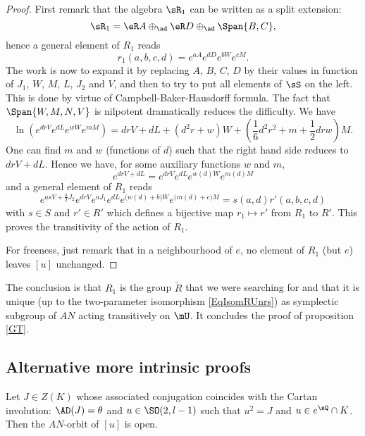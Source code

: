 \begin{proof}

First remark that the algebra $\sR_1$ can be written as a split extension:
\[ 
  \sR_1=\eR A\oplus_{\ad} \eR D\oplus_{\ad}\Span\{ B,C \},
\]
hence a general element of $R_1$ reads
 \begin{equation}
r_1(a,b,c,d)= e^{aA} e^{dD} e^{bW} e^{cM}.
\end{equation}
The work is now to expand it by replacing $A$, $B$, $C$, $D$ by their values in function of $J_1$, $W$, $M$, $L$, $J_2$ and $V$, and then to try to put all elements of $\sS$ on the left. This is done by virtue of Campbell-Baker-Hausdorff formula. The fact that $\Span\{ W,M,N,V \}$ is nilpotent dramatically reduces the difficulty. We have
\[ 
  \ln( e^{drV} e^{dL} e^{wW} e^{mM})= drV+dL+(d^{2}r+w)W+(\frac{1}{ 6 }d^{2}r^{2}+m+\frac{ 1 }{2}drw)M.
\]
One can find $m$ and $w$ (functions of $d$) such that the right hand side reduces to $drV+dL$. Hence we have, for some auxiliary functions $w$ and $m$,
\[ 
   e^{drV+dL}= e^{drV} e^{dL} e^{w(d)W} e^{m(d)M}
\]
and a general element of $R_1$ reads
\begin{equation}
 e^{asV+\frac{ a }{2}J_2} e^{drV} e^{aJ_1} e^{dL} e^{\big( w(d)+b \big)W} e^{\big( m(d)+c \big)M}=s(a,d)r'(a,b,c,d)
\end{equation}
with $s\in S$ and $r'\in R'$ which defines a bijective map $r_1\mapsto r'$ from $R_1$ to $R'$. This proves the transitivity of the action of $R_1$.

 For freeness, just remark that in a neighbourhood of $e$, no element of $R_1$ (but $e$) leaves $[u]$ unchanged.
\end{proof}

The conclusion is that $R_1$ is the group $\tilde{R}$ that we were searching for and that it is unique (up to the two-parameter isomorphism \eqref{EqIsomRUnrs}) as symplectic subgroup of $AN$ acting transitively on $\mU$. It concludes the proof of proposition \ref{GT}.

\subsection{Alternative more intrinsic proofs}      \label{subSecAltreintr}

\begin{proposition}
Let $J\in Z(K)$ whose associated conjugation coincides with the Cartan involution: $\AD(J)=\theta$ and $u\in\SO(2,l-1)$ such that $u^2=J$ and $u\in e^{\sQ}\cap K$. Then the $AN$-orbit of $[u]$ is open.
\end{proposition}


